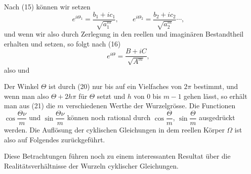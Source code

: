 
Nach (15) können wir setzen
\[
e^{i\Theta_1} = \frac{b_1 + ic_1}{\sqrt{a_1^m}}, \qquad e^{i\Theta_2} = \frac{b_2 + ic_2}{\sqrt{a_2^m}} \cdots,
\]
und wenn wir also durch Zerlegung in den reellen und imaginären Bestandtheil
erhalten und
setzen, so folgt nach (16)
\[
e^{i\Theta} = \frac{B + iC}{\sqrt{A^m}},
\]
also
und

Der Winkel $\Theta$ ist durch (20) nur bis auf ein Vielfaches von
$2\pi$ bestimmt, und wenn man also $\Theta + 2h\pi$ für $\Theta$ setzt und $h$
von $0$ bis $m - 1$ gehen lässt, so erhält man aus (21) die $m$ verschiedenen Werthe der Wurzelgrösse. Die Functionen $\cos\dfrac{\Theta\nu}{m}$
und $\sin\dfrac{\Theta\nu}{m}$ können noch rational durch $\cos\dfrac{\Theta}{m}$, $\sin\dfrac{\Theta}{m}$ ausgedrückt werden. Die Auflösung der cyklischen Gleichungen in
dem reellen Körper $\Omega$ ist also auf Folgendes zurückgeführt.


Diese Betrachtungen führen noch zu einem interessanten
Resultat über die Realitätsverhältnisse der Wurzeln cyklischer
Gleichungen.
